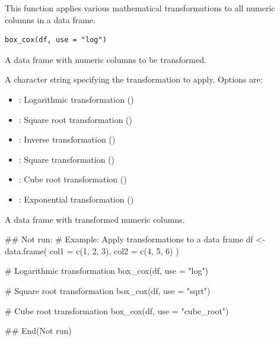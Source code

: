 \documentclass[a4paper]{book}
\begin{document}
%
\begin{Description}
This function applies various mathematical transformations to all numeric columns in a data frame.
\end{Description}
%
\begin{Usage}
\begin{verbatim}
box_cox(df, use = "log")
\end{verbatim}
\end{Usage}
%
\begin{Arguments}
\begin{ldescription}
\item[\code{df}] A data frame with numeric columns to be transformed.

\item[\code{use}] A character string specifying the transformation to apply. Options are:
\begin{itemize}

\item{} : Logarithmic transformation ()
\item{} : Square root transformation ()
\item{} : Inverse transformation ()
\item{} : Square transformation ()
\item{} : Cube root transformation ()
\item{} : Exponential transformation ()

\end{itemize}

\end{ldescription}
\end{Arguments}
%
\begin{Value}
A data frame with transformed numeric columns.
\end{Value}
%
\begin{Examples}
\begin{ExampleCode}
\#\# Not run: 
# Example: Apply transformations to a data frame
df <- data.frame(
  col1 = c(1, 2, 3),
  col2 = c(4, 5, 6)
)

# Logarithmic transformation
box_cox(df, use = "log")

# Square root transformation
box_cox(df, use = "sqrt")

# Cube root transformation
box_cox(df, use = "cube_root")

## End(Not run)
\end{ExampleCode}
\end{Examples}
\end{document}
